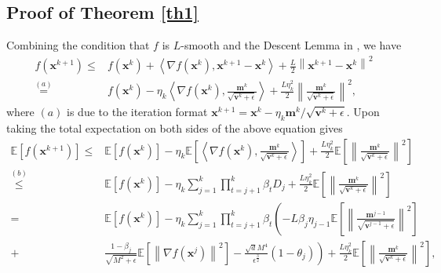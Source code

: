 \documentclass[twoside,11pt]{article}
\begin{document}
\subsection{Proof of Theorem \ref{th1}}\label{Proof of th1}
Combining the condition that $f$ is $L$-smooth and the Descent Lemma in  \citep{nesterov2003introductory}, we have
\begin{equation}
   	\begin{aligned}
   	f(\mathbf{x}^{k+1})\le&f(\mathbf{x}^k)+\left\langle \nabla f(\mathbf{x}^k),\mathbf{x}^{k+1}-\mathbf{x}^k\right\rangle +\frac{L}{2}\left\|  \mathbf{x}^{k+1}-\mathbf{x}^k\right\|  ^2\\
   	\overset{(a)}{=}&f(\mathbf{x}^k)-\eta_k\left\langle \nabla f(\mathbf{x}^k),\frac{\mathbf{m}^k}{\sqrt{{\mathbf{v}}^k+\epsilon}}\right\rangle +\frac{L\eta_k^2}{2}\left\|  \frac{\mathbf{m}^k}{\sqrt{{\mathbf{v}}^k+\epsilon}}\right\| ^2,\nonumber
   	\end{aligned}
\end{equation}
where $(a)$ is due to the iteration format $\mathbf{x}^{k+1}=\mathbf{x}^k-\eta_k{\mathbf{m}^k}/{\sqrt{{\mathbf{v}}^k+\epsilon}}$. Upon taking the  total expectation on both sides of the above equation gives
\begin{equation}\label{th1.2}
   	\begin{aligned}
   	\mathbb{E}\left[ f(\mathbf{x}^{k+1})\right]
   	\le&\mathbb{E}\left[ f(\mathbf{x}^k)\right] -\eta_k\mathbb{E}\left[ \left\langle \nabla f(\mathbf{x}^k),\frac{\mathbf{m}^k}{\sqrt{{\mathbf{v}}^k+\epsilon}}\right\rangle\right] +\frac{L\eta_k^2}{2}\mathbb{E}\left[ \left\|  \frac{\mathbf{m}^k}{\sqrt{{\mathbf{v}}^k+\epsilon}}\right\| ^2\right] \\
   	\overset{(b)}{\le}&\mathbb{E}\left[ f(\mathbf{x}^k)\right] -\eta_k\sum_{j=1}^{k}\prod_{t=j+1}^{k}\beta_{t}D_j  +\frac{L\eta_k^2}{2}\mathbb{E}\left[ \left\|  \frac{\mathbf{m}^k}{\sqrt{{\mathbf{v}}^k+\epsilon}}\right\| ^2\right] \\
   	=&\mathbb{E}\left[ f(\mathbf{x}^k)\right] -\eta_k\sum_{j=1}^{k}\prod_{t=j+1}^{k}\beta_{t}\left( -L\beta_{j} \eta_{j-1}\mathbb{E}\left[\left\| \frac{ \mathbf{m}^{j-1}}{\sqrt{\mathbf{v}^{j-1}+\epsilon}}\right\|^2\right] 
   	\right.\\
   	+&\left.\frac{1-\beta_{j}}{\sqrt{M^2+\epsilon}}\mathbb{E}\left[\left\| \nabla f(\mathbf{x}^j)\right\|^2\right]
   	-\frac{\sqrt{d}  M^4}
   	{\epsilon^{\frac{3}{2}}}(1-\theta_j)\right) +\frac{L\eta_k^2}{2}\mathbb{E}\left[ \left\|  \frac{\mathbf{m}^k}{\sqrt{{\mathbf{v}}^k+\epsilon}}\right\| ^2\right], \nonumber
   	\end{aligned}
\end{equation}
\end{document}
